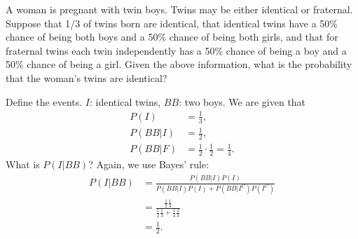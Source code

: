 

\setcounter{theorem}{1}
\begin{exercise}[BH.2.2]
A woman is pregnant with twin boys. Twins may be either identical or fraternal. Suppose that 1/3 of twins born are identical, that identical twins have a 50\% chance of being both boys and a 50\% chance of being both girls, and that for fraternal twins each twin independently has a 50\% chance of being a boy and a 50\% chance of being a girl. Given the above information, what is the probability that the woman’s twins are identical?
\begin{solution}
	Define the events. $I$: identical twins, $BB$: two boys. We are given that
	\begin{align*}
		P(I) &= \frac{1}{3},\\
		P(BB|I) & = \frac{1}{2},\\
		P(BB|F)& = \frac{1}{2}\cdot\frac{1}{2} = \frac{1}{4}.
	\end{align*}
	What is $P(I|BB)$? Again, we use Bayes' rule:
	\begin{align*}
		P(I|BB)&= \frac{P(BB|I)P(I)}{P(BB|I)P(I) + P(BB|I^{C})P(I^C)}\\
		&=\frac{ \frac{1}{2}\frac{1}{3}}{\frac{1}{2}\frac{1}{3} + \frac{1}{4}\frac{2}{3}}\\
		& = \frac{1}{2}.
	\end{align*}
\end{solution}
\end{exercise}

